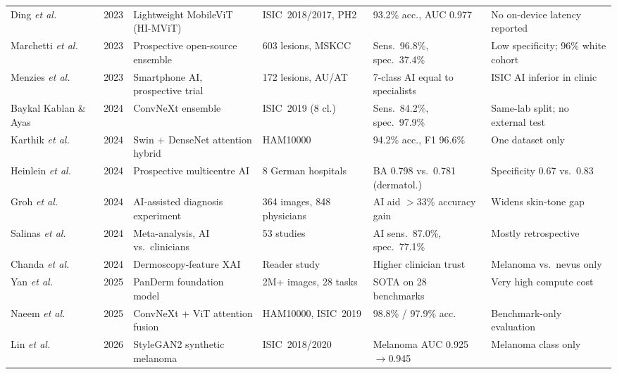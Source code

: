 \begin{table}[t]
\begin{tabularx}{\textwidth}{@{}L{2.4cm} c L{3.4cm} L{2.2cm} L{3.0cm} Y@{}}
Ding \emph{et al.}~\cite{ding2023} & 2023 & Lightweight MobileViT (HI-MViT) & ISIC~2018/2017, PH2 & 93.2\% acc., AUC 0.977 & No on-device latency reported \\
Marchetti \emph{et al.}~\cite{marchetti2023} & 2023 & Prospective open-source ensemble & 603 lesions, MSKCC & Sens.\ 96.8\%, spec.\ 37.4\% & Low specificity; 96\% white cohort \\
Menzies \emph{et al.}~\cite{menzies2023} & 2023 & Smartphone AI, prospective trial & 172 lesions, AU/AT & 7-class AI equal to specialists & ISIC AI inferior in clinic \\
Baykal Kablan \& Ayas~\cite{baykal2024convnext} & 2024 & ConvNeXt ensemble & ISIC~2019 (8 cl.) & Sens.\ 84.2\%, spec.\ 97.9\% & Same-lab split; no external test \\
Karthik \emph{et al.}~\cite{karthik2024} & 2024 & Swin + DenseNet attention hybrid & HAM10000 & 94.2\% acc., F1 96.6\% & One dataset only \\
Heinlein \emph{et al.}~\cite{heinlein2024} & 2024 & Prospective multicentre AI & 8 German hospitals & BA 0.798 vs.\ 0.781 (dermatol.) & Specificity 0.67 vs.\ 0.83 \\
Groh \emph{et al.}~\cite{groh2024} & 2024 & AI-assisted diagnosis experiment & 364 images, 848 physicians & AI aid $>$33\% accuracy gain & Widens skin-tone gap \\
Salinas \emph{et al.}~\cite{salinas2024} & 2024 & Meta-analysis, AI vs.\ clinicians & 53 studies & AI sens.\ 87.0\%, spec.\ 77.1\% & Mostly retrospective \\
Chanda \emph{et al.}~\cite{chanda2024} & 2024 & Dermoscopy-feature XAI & Reader study & Higher clinician trust & Melanoma vs.\ nevus only \\
Yan \emph{et al.}~\cite{yan2025panderm} & 2025 & PanDerm foundation model & 2M+ images, 28 tasks & SOTA on 28 benchmarks & Very high compute cost \\
Naeem \emph{et al.}~\cite{naeem2025} & 2025 & ConvNeXt + ViT attention fusion & HAM10000, ISIC~2019 & 98.8\% / 97.9\% acc. & Benchmark-only evaluation \\
Lin \emph{et al.}~\cite{lin2026} & 2026 & StyleGAN2 synthetic melanoma & ISIC~2018/2020 & Melanoma AUC 0.925$\rightarrow$0.945 & Melanoma class only \\
\bottomrule
\end{tabularx}
\end{table}


